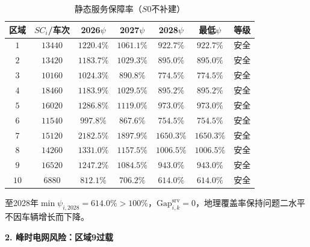 \documentclass[a4paper,12pt]{ctexart}
\begin{document}
\begin{table}[H]
\centering
\caption{静态服务保障率（$S0$不补建）}
\begin{tabular}{ccccccc}
\toprule
区域 & $SC_{i}$/车次 & 2026$\psi$ & 2027$\psi$ & 2028$\psi$ & 最低$\psi$ & 等级 \\
\midrule
$1$ & $13440$ & $1220.4\%$ & $1061.1\%$ & $922.7\%$ & $922.7\%$ & 安全 \\
$2$ & $13420$ & $1183.7\%$ & $1029.3\%$ & $895.0\%$ & $895.0\%$ & 安全 \\
$3$ & $10160$ & $1024.3\%$ & $890.8\%$ & $774.5\%$ & $774.5\%$ & 安全 \\
$4$ & $18460$ & $1183.9\%$ & $1029.5\%$ & $895.2\%$ & $895.2\%$ & 安全 \\
$5$ & $16020$ & $1286.8\%$ & $1119.0\%$ & $973.0\%$ & $973.0\%$ & 安全 \\
$6$ & $11540$ & $997.8\%$ & $867.6\%$ & $754.5\%$ & $754.5\%$ & 安全 \\
$7$ & $15120$ & $2182.5\%$ & $1897.9\%$ & $1650.3\%$ & $1650.3\%$ & 安全 \\
$8$ & $14260$ & $1331.0\%$ & $1157.5\%$ & $1006.5\%$ & $1006.5\%$ & 安全 \\
$9$ & $16520$ & $1247.2\%$ & $1084.5\%$ & $943.0\%$ & $943.0\%$ & 安全 \\
$10$ & $6880$ & $812.1\%$ & $706.2\%$ & $\mathbf{614.0\%}$ & $\mathbf{614.0\%}$ & 安全 \\
\bottomrule
\end{tabular}
\end{table}

至2028年$\min\psi_{i,2028}=614.0\%>100\%$，$\mathrm{Gap}_{i,k}^{\mathrm{srv}}=0$，地理覆盖率保持问题二水平不因车辆增长而下降。


\textbf{2. 峰时电网风险：区域9过载}
\end{document}
